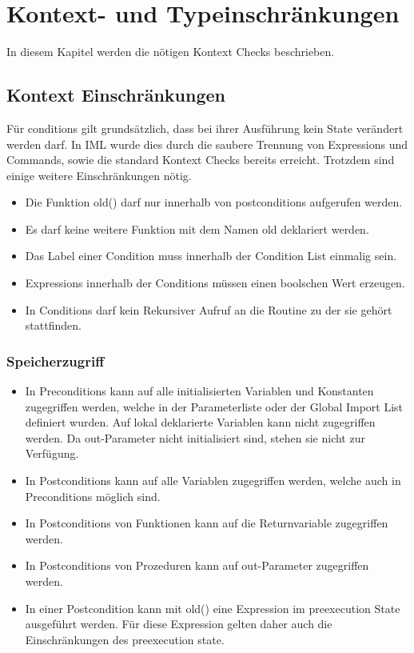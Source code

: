 \section{Kontext- und Typeinschränkungen}
\label{sec:constraints}
In diesem Kapitel werden die nötigen Kontext Checks beschrieben.

\subsection{Kontext Einschränkungen}

Für conditions gilt grundsätzlich, dass bei ihrer Ausführung kein State verändert werden 
darf. In IML wurde dies durch die saubere Trennung von Expressions und Commands, sowie die standard
Kontext Checks bereits erreicht. Trotzdem sind einige weitere Einschränkungen nötig.

\begin{itemize}

\item Die Funktion old() darf nur innerhalb von postconditions aufgerufen werden.
\item Es darf keine weitere Funktion mit dem Namen old deklariert werden.
\item Das Label einer Condition muss innerhalb der Condition List einmalig sein.
\item Expressions innerhalb der Conditions müssen einen boolschen Wert erzeugen.
\item In Conditions darf kein Rekursiver Aufruf an die Routine zu der sie gehört stattfinden.

\end{itemize}

\subsubsection{Speicherzugriff}

\begin{itemize}
\item In Preconditions kann auf alle initialisierten Variablen und Konstanten zugegriffen werden, welche 
in der Parameterliste oder der Global Import List definiert wurden. Auf lokal deklarierte Variablen 
kann nicht zugegriffen werden. Da out-Parameter nicht initialisiert sind, stehen sie nicht zur
Verfügung.
\item In Postconditions kann auf alle Variablen zugegriffen werden, welche auch in 
Preconditions möglich sind. 
\item In Postconditions von Funktionen kann auf die Returnvariable zugegriffen werden.
\item In Postconditions von Prozeduren kann auf out-Parameter zugegriffen werden.
\item In einer Postcondition kann mit old() eine Expression im preexecution State ausgeführt werden. Für diese Expression 
gelten daher auch die Einschränkungen des preexecution state.

\end{itemize}



